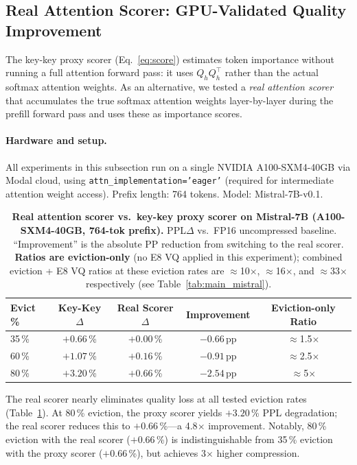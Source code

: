 \documentclass{article}
\begin{document}
\subsection{Real Attention Scorer: GPU-Validated Quality Improvement}
\label{sec:real_scorer}

The key-key proxy scorer (Eq.~\ref{eq:score}) estimates token importance without
running a full attention forward pass: it uses $Q_hQ_h^\top$ rather than the actual
softmax attention weights. As an alternative, we tested a \emph{real attention scorer}
that accumulates the true softmax attention weights layer-by-layer during the prefill
forward pass and uses these as importance scores.

\paragraph{Hardware and setup.}
All experiments in this subsection run on a single NVIDIA A100-SXM4-40GB via Modal
cloud, using \texttt{attn\_implementation='eager'} (required for intermediate
attention weight access). Prefix length: 764 tokens. Model: Mistral-7B-v0.1.

\begin{table}[h]
\centering
\caption{\textbf{Real attention scorer vs.\ key-key proxy scorer on Mistral-7B
  (A100-SXM4-40GB, 764-tok prefix).} PPL$\Delta$ vs.\ FP16 uncompressed baseline.
  ``Improvement'' is the absolute PP reduction from switching to the real scorer.
  \textbf{Ratios are eviction-only} (no E8 VQ applied in this experiment);
  combined eviction + E8 VQ ratios at these eviction rates are $\approx$10$\times$,
  $\approx$16$\times$, and $\approx$33$\times$ respectively (see Table~\ref{tab:main_mistral}).}
\label{tab:real_scorer}
\begin{tabular}{@{}lcccc@{}}
\toprule
Evict\,\% & Key-Key $\Delta$ & Real Scorer $\Delta$ & Improvement & Eviction-only Ratio \\
\midrule
35\,\% & $+0.66$\,\% & $+0.00$\,\% & $-0.66$\,pp & $\approx$1.5$\times$ \\
60\,\% & $+1.07$\,\% & $+0.16$\,\% & $-0.91$\,pp & $\approx$2.5$\times$ \\
80\,\% & $+3.20$\,\% & $+0.66$\,\% & $-2.54$\,pp & $\approx$5$\times$ \\
\bottomrule
\end{tabular}
\end{table}

The real scorer nearly eliminates quality loss at all tested eviction rates
(Table~\ref{tab:real_scorer}). At 80\,\% eviction, the proxy scorer yields
$+3.20$\,\% PPL degradation; the real scorer reduces this to $+0.66$\,\%---a
4.8$\times$ improvement. Notably, 80\,\% eviction with the real scorer ($+0.66$\,\%)
is indistinguishable from 35\,\% eviction with the proxy scorer ($+0.66$\,\%), but
achieves 3$\times$ higher compression.
\end{document}
